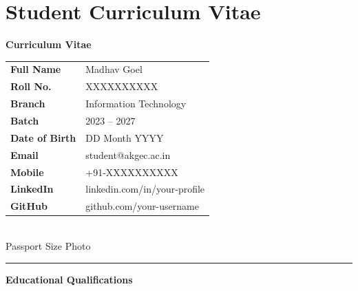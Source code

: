 \chapter{Student Curriculum Vitae}
\label{app:cv}

\newpage
\thispagestyle{fancy}

\begin{center}
  {\Large\textbf{Curriculum Vitae}}
\end{center}

\vspace{0.3cm}

\noindent
\begin{minipage}[t]{0.72\textwidth}
  \begin{tabular}{@{}p{3.5cm}p{7cm}}
    \textbf{Full Name}      & Madhav Goel \\[4pt]
    \textbf{Roll No.}       & XXXXXXXXXX \\[4pt]
    \textbf{Branch}         & Information Technology \\[4pt]
    \textbf{Batch}          & 2023 -- 2027 \\[4pt]
    \textbf{Date of Birth}  & DD Month YYYY \\[4pt]
    \textbf{Email}          & student@akgec.ac.in \\[4pt]
    \textbf{Mobile}         & +91-XXXXXXXXXX \\[4pt]
    \textbf{LinkedIn}       & linkedin.com/in/your-profile \\[4pt]
    \textbf{GitHub}         & github.com/your-username \\
  \end{tabular}
\end{minipage}
\hfill
\begin{minipage}[t]{0.24\textwidth}
  \centering
  \setlength{\fboxsep}{0pt}
  \fbox{\rule{3.5cm}{0pt}\rule{0pt}{4.5cm}}\\[2pt]
  {\small Passport Size Photo}
\end{minipage}

\vspace{0.5cm}\hrule\vspace{0.4cm}

\noindent\textbf{Educational Qualifications}
\vspace{0.2cm}

